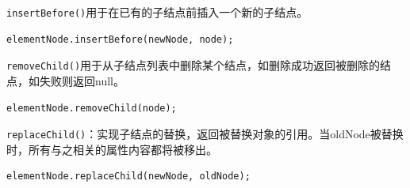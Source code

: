 \lstinline|insertBefore()|用于在已有的子结点前插入一个新的子结点。 \\

\begin{lstlisting}[style=htmlcssjs]
elementNode.insertBefore(newNode, node);
\end{lstlisting}

\lstinline|removeChild()|用于从子结点列表中删除某个结点，如删除成功返回被删除的结点，如失败则返回null。 \\

\begin{lstlisting}[style=htmlcssjs]
elementNode.removeChild(node);
\end{lstlisting}

\lstinline|replaceChild()|：实现子结点的替换，返回被替换对象的引用。当oldNode被替换时，所有与之相关的属性内容都将被移出。 \\

\begin{lstlisting}[style=htmlcssjs]
elementNode.replaceChild(newNode, oldNode);
\end{lstlisting}